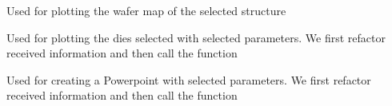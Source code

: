 \documentclass[letterpaper,10pt,english]{sphinxmanual}
\begin{document}

\begin{fulllineitems}
\label{\detokenize{app:app.personal_wafer_map}}
\pysigstartsignatures
{}
\pysigstopsignatures
\sphinxAtStartPar
Used for plotting the wafer map of the selected structure

\end{fulllineitems}


\begin{fulllineitems}
\label{\detokenize{app:app.plot_we_want}}
\pysigstartsignatures
{}
\pysigstopsignatures
\sphinxAtStartPar
Used for plotting the dies selected with selected parameters. We first refactor received information and then call the function

\end{fulllineitems}


\begin{fulllineitems}
\label{\detokenize{app:app.ppt_structure_route}}
\pysigstartsignatures
{}
\pysigstopsignatures
\sphinxAtStartPar
Used for creating a Powerpoint with selected parameters. We first refactor received information and then call the function

\end{fulllineitems}
\end{document}
